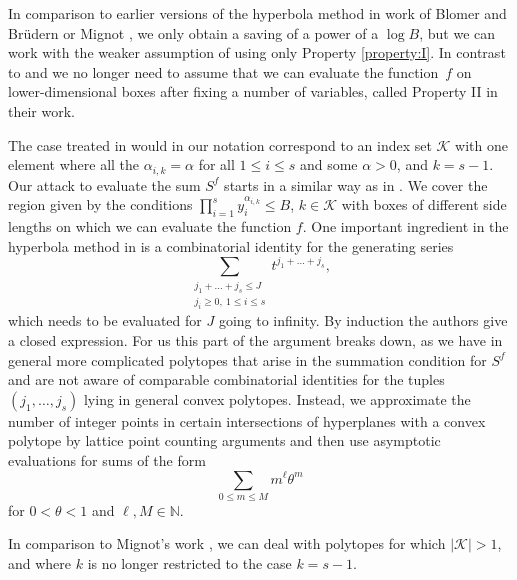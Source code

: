 \documentclass[JEP,XML,SOM,Unicode,published]{cedram}
\let\tet\theta
\newcommand{\calK}{\mathcal{K}}
\newcommand{\N}{\mathbb{N}}
\theoremstyle{definition}
\numberwithin{theorem}{section}
\begin{document}
In comparison to earlier versions of the hyperbola method in work of Blomer and Brüdern \cite{BB} or Mignot \cite{mignot2}, we only obtain a saving of a power of a $\log B$, but we can work with the weaker assumption of using only Property \ref{property:I}. In contrast to \cite{BB} and \cite{mignot2} we no longer need to assume that we can evaluate the function~$f$ on lower-dimensional boxes after fixing a number of variables, called Property II in their work.\par
The case treated in \cite{BB} would in our notation correspond to an index set $\calK$ with one element where all the $\alpha_{i,k}=\alpha$ for all $1\leq i\leq s$ and some $\alpha>0$, and $k=s-1$. Our attack to evaluate the sum $S^f$ starts in a similar way as in \cite{BB}. We cover the region given by the conditions $\prod_{i=1}^s y_i^{\alpha_{i,k}}\leq B$, $k\in \calK$ with boxes of different side lengths on which we can evaluate the function $f$. One important ingredient in the hyperbola method in \cite{BB} is a combinatorial identity for the generating series
\[
\sum_{\substack{j_1+\ldots +j_s\leq J\\ j_i\geq 0,\ 1\leq i\leq s}}t^{j_1+\ldots + j_s},
\]
which needs to be evaluated for $J$ going to infinity. By induction the authors give a closed expression. For us this part of the argument breaks down, as we have in general more complicated polytopes that arise in the summation condition for $S^f$ and are not aware of comparable combinatorial identities for the tuples $(j_1,\ldots, j_s)$ lying in general convex polytopes. Instead, we approximate the number of integer points in certain intersections of hyperplanes with a convex polytope by lattice point counting arguments and then use asymptotic evaluations for sums of the form
\[
\sum_{0\leq m\leq M} m^\ell \tet^m
\]
for $0<\tet<1$ and $\ell,M\in \N$.\par
In comparison to Mignot's work \cite{mignot2}, we can deal with polytopes for which $|\mathcal{K}|>1$, and where $k$ is no longer restricted to the case $k=s-1$.
\end{document}

